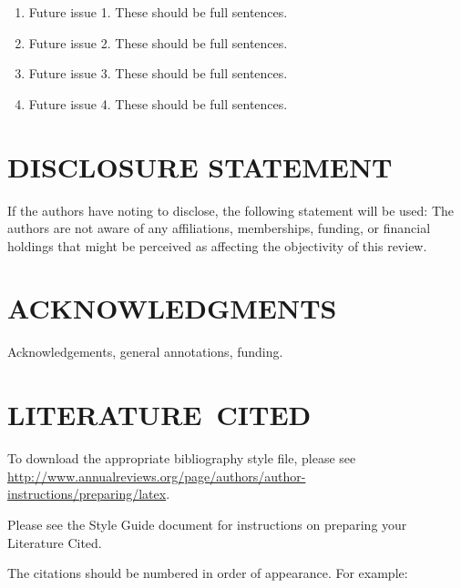 \documentclass{ar-1col}
\begin{document}
\begin{issues}
\begin{enumerate}
\item Future issue 1. These should be full sentences.
\item Future issue 2. These should be full sentences.
\item Future issue 3. These should be full sentences.
\item Future issue 4. These should be full sentences.
\end{enumerate}
\end{issues}

\section*{DISCLOSURE STATEMENT}
If the authors have noting to disclose, the following statement will be used: The authors are not aware of any affiliations, memberships, funding, or financial holdings that
might be perceived as affecting the objectivity of this review. 

\section*{ACKNOWLEDGMENTS}
Acknowledgements, general annotations, funding.

%
\section*{LITERATURE\ CITED}

To download the appropriate bibliography style file, please see \url{http://www.annualreviews.org/page/authors/author-instructions/preparing/latex}. 

\noindent
Please see the Style Guide document for instructions on preparing your Literature Cited.

The citations should be numbered in order of appearance. For example:
\end{document}

